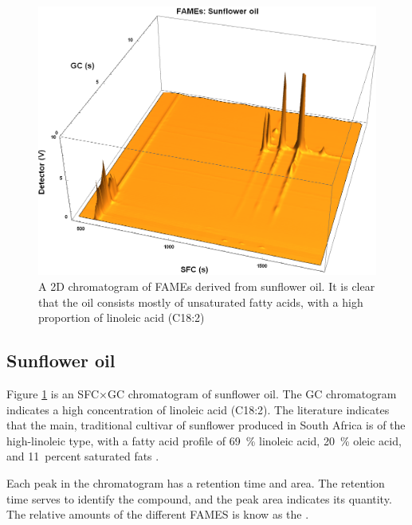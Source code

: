 \begin{figure}
\centering
\includegraphics[width=\textwidth]{Figures/Sunflower.png}
\decoRule

\caption[SFC×GC of sunflower oil]{A 2D chromatogram of FAMEs derived from
sunflower oil. It is clear that the oil consists mostly of unsaturated fatty
acids, with a high proportion of linoleic acid (C18:2)}

\label{fig:2DSunflower}
\end{figure}

\subsection{Sunflower oil}

Figure \ref{fig:2DSunflower} is an SFC×GC chromatogram of sunflower oil. The GC
chromatogram indicates a high concentration of linoleic acid (C18:2). The
literature indicates that the main, traditional cultivar of sunflower produced
in South Africa is of the high-linoleic type, with a fatty acid profile of
\SI{69}{\percent} linoleic acid, \SI{20}{\percent} oleic acid, and
\SI{11}{percent} saturated fats \autocite {JFAOWHOCAC2019}.

Each peak in the chromatogram has a
retention time and area. The retention time serves to identify the compound, and
the peak area indicates its quantity. The relative amounts of the different
FAMES is know as the .

